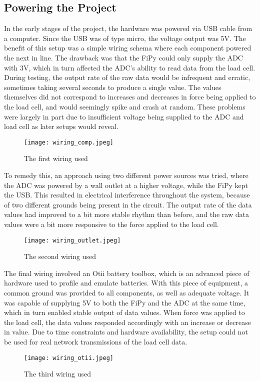 \subsection{Powering the Project}
In the early stages of the project, the hardware was powered via USB cable from a computer. Since the USB was of type micro, the voltage output was 5V. The benefit of this setup was a simple wiring schema where each component powered the next in line. The drawback was that the FiPy could only supply the ADC with 3V, which in turn affected the ADC's ability to read data from the load cell. During testing, the output rate of the raw data would be infrequent and erratic, sometimes taking several seconds to produce a single value. The values themselves did not correspond to increases and decreases in force being applied to the load cell, and would seemingly spike and crash at random. These problems were largely in part due to insufficient voltage being supplied to the ADC and load cell as later setups would reveal.
\begin{figure}[h]
	\centering
	\texttt{[image: wiring\_comp.jpeg]}
	\caption{The first wiring used\cite{lucid-chart}}
	\label{fig:wiring_comp}
\end{figure}

To remedy this, an approach using two different power sources was tried, where the ADC was powered by a wall outlet at a higher voltage, while the FiPy kept the USB. This resulted in electrical interference throughout the system, because of two different grounds being present in the circuit. The output rate of the data values had improved to a bit more stable rhythm than before, and the raw data values were a bit more responsive to the force applied to the load cell. 
\begin{figure}[h]
	\centering
	\texttt{[image: wiring\_outlet.jpeg]}
	\caption{The second wiring used\cite{lucid-chart}}
	\label{fig:wiring_outlet}
\end{figure}

The final wiring involved an Otii battery toolbox, which is an advanced piece of hardware used to profile and emulate batteries.\cite{otii-web} With this piece of equipment, a common ground was provided to all components, as well as adequate voltage. It was capable of supplying 5V to both the FiPy and the ADC at the same time, which in turn enabled stable output of data values. When force was applied to the load cell, the data values responded accordingly with an increase or decrease in value. Due to time constraints and hardware availability, the setup could not be used for real network transmissions of the load cell data.
\begin{figure}[h]
	\centering
	\texttt{[image: wiring\_otii.jpeg]}
	\caption{The third wiring used\cite{lucid-chart}}
	\label{fig:wiring_otii}
\end{figure}

